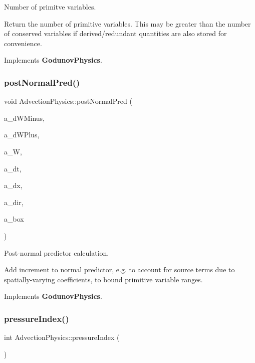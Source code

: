 Number of primitve variables. 

Return the number of primitive variables. This may be greater than the number of conserved variables if derived/redundant quantities are also stored for convenience. 

Implements \textbf{ Godunov\+Physics}.

\mbox{\label{class_advection_physics_adcff7bb0c3cf117a51836754921ea75a}} 
\subsubsection{\texorpdfstring{post\+Normal\+Pred()}{postNormalPred()}}
{\footnotesize\ttfamily void Advection\+Physics\+::post\+Normal\+Pred (\begin{DoxyParamCaption}\item[{\textbf{ F\+Array\+Box} \&}]{a\+\_\+d\+W\+Minus,  }\item[{\textbf{ F\+Array\+Box} \&}]{a\+\_\+d\+W\+Plus,  }\item[{const \textbf{ F\+Array\+Box} \&}]{a\+\_\+W,  }\item[{const \textbf{ Real} \&}]{a\+\_\+dt,  }\item[{const \textbf{ Real} \&}]{a\+\_\+dx,  }\item[{const int \&}]{a\+\_\+dir,  }\item[{const \textbf{ Box} \&}]{a\+\_\+box }\end{DoxyParamCaption})\hspace{0.3cm}{\ttfamily [virtual]}}



Post-\/normal predictor calculation. 

Add increment to normal predictor, e.\+g. to account for source terms due to spatially-\/varying coefficients, to bound primitive variable ranges. 

Implements \textbf{ Godunov\+Physics}.

\mbox{\label{class_advection_physics_a7b88645af918e8ae6ad2ec21eb49734f}} 
\subsubsection{\texorpdfstring{pressure\+Index()}{pressureIndex()}}
{\footnotesize\ttfamily int Advection\+Physics\+::pressure\+Index (\begin{DoxyParamCaption}{ }\end{DoxyParamCaption})\hspace{0.3cm}{\ttfamily [virtual]}}



